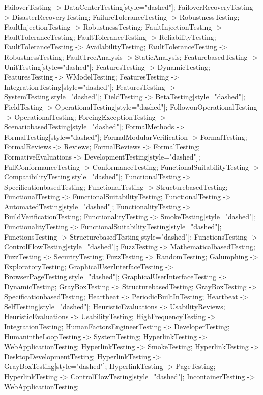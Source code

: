 \documentclass{article}
\begin{document}
{FailoverTesting -> DataCenterTesting[style="dashed"];
FailoverRecoveryTesting -> DisasterRecoveryTesting;
FailureToleranceTesting -> RobustnessTesting;
FaultInjectionTesting -> RobustnessTesting;
FaultInjectionTesting -> FaultToleranceTesting;
FaultToleranceTesting -> ReliabilityTesting;
FaultToleranceTesting -> AvailabilityTesting;
FaultToleranceTesting -> RobustnessTesting;
FaultTreeAnalysis -> StaticAnalysis;
FeaturebasedTesting -> UnitTesting[style="dashed"];
FeaturesTesting -> DynamicTesting;
FeaturesTesting -> WModelTesting;
FeaturesTesting -> IntegrationTesting[style="dashed"];
FeaturesTesting -> SystemTesting[style="dashed"];
FieldTesting -> BetaTesting[style="dashed"];
FieldTesting -> OperationalTesting[style="dashed"];
FollowonOperationalTesting -> OperationalTesting;
ForcingExceptionTesting -> ScenariobasedTesting[style="dashed"];
FormalMethods -> FormalTesting[style="dashed"];
FormalModularVerification -> FormalTesting;
FormalReviews -> Reviews;
FormalReviews -> FormalTesting;
FormativeEvaluations -> DevelopmentTesting[style="dashed"];
FullConformanceTesting -> ConformanceTesting;
FunctionalSuitabilityTesting -> CompatibilityTesting[style="dashed"];
FunctionalTesting -> SpecificationbasedTesting;
FunctionalTesting -> StructurebasedTesting;
FunctionalTesting -> FunctionalSuitabilityTesting;
FunctionalTesting -> AutomatedTesting[style="dashed"];
FunctionalityTesting -> BuildVerificationTesting;
FunctionalityTesting -> SmokeTesting[style="dashed"];
FunctionalityTesting -> FunctionalSuitabilityTesting[style="dashed"];
FunctionsTesting -> StructurebasedTesting[style="dashed"];
FunctionsTesting -> ControlFlowTesting[style="dashed"];
FuzzTesting -> MathematicalbasedTesting;
FuzzTesting -> SecurityTesting;
FuzzTesting -> RandomTesting;
Galumphing -> ExploratoryTesting;
GraphicalUserInterfaceTesting -> BrowserPageTesting[style="dashed"];
GraphicalUserInterfaceTesting -> DynamicTesting;
GrayBoxTesting -> StructurebasedTesting;
GrayBoxTesting -> SpecificationbasedTesting;
Heartbeat -> PeriodicBuiltInTesting;
Heartbeat -> SelfTesting[style="dashed"];
HeuristicEvaluations -> UsabilityReviews;
HeuristicEvaluations -> UsabilityTesting;
HighFrequencyTesting -> IntegrationTesting;
HumanFactorsEngineerTesting -> DeveloperTesting;
HumanintheLoopTesting -> SystemTesting;
HyperlinkTesting -> WebApplicationTesting;
HyperlinkTesting -> SmokeTesting;
HyperlinkTesting -> DesktopDevelopmentTesting;
HyperlinkTesting -> GrayBoxTesting[style="dashed"];
HyperlinkTesting -> PageTesting;
HyperlinkTesting -> ControlFlowTesting[style="dashed"];
IncontainerTesting -> WebApplicationTesting;
}
\end{document}
